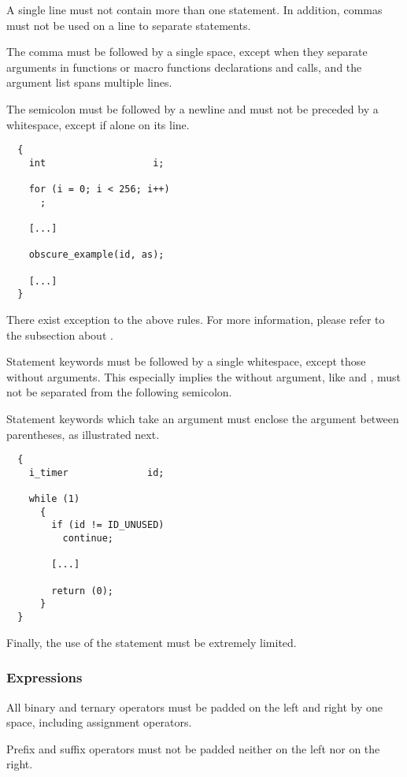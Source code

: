A single line must not contain more than one statement. In addition, commas
must not be used on a line to separate statements.

The comma must be followed by a single space, except when they separate
arguments in functions or macro functions declarations and calls, and the
argument list spans multiple lines.

The semicolon must be followed by a newline and must not be preceded by
a whitespace, except if alone on its line.

\begin{verbatim}
  {
    int                   i;

    for (i = 0; i < 256; i++)
      ;

    [...]

    obscure_example(id, as);

    [...]
  }
\end{verbatim}

There exist exception to the above rules. For more information, please
refer to the subsection about .

Statement keywords must be followed by a single whitespace, except
those without arguments. This especially implies the  without
argument, like  and , must not be separated
from the following semicolon.

Statement keywords which take an argument must enclose the argument
between parentheses, as illustrated next.

\begin{verbatim}
  {
    i_timer              id;

    while (1)
      {
        if (id != ID_UNUSED)
          continue;

        [...]

        return (0);
      }
  }
\end{verbatim}

Finally, the use of the  statement must be extremely limited.


\subsubsection{Expressions}

All binary and ternary operators must be padded on the left and right by
one space, including assignment operators.

Prefix and suffix operators must not be padded neither on the left nor on
the right.

